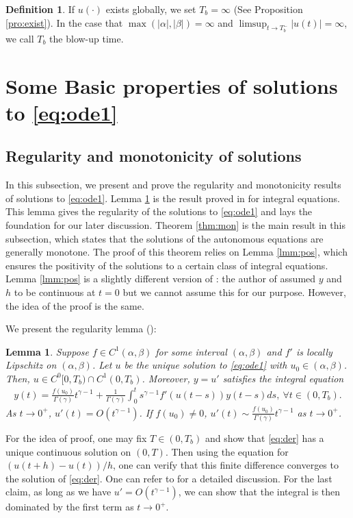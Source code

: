 \documentclass[12pt]{amsart}%
\newtheorem{lmm}[thm]{Lemma}
\theoremstyle{definition}
\newtheorem{definition}[thm]{Definition}
\theoremstyle{remark}
\begin{document}
\begin{definition}
If $u(\cdot)$ exists globally, we set $T_b=\infty$ (See Proposition \ref{pro:exist}). In the case that $\max(|\alpha|, |\beta|)=\infty$ and $\limsup_{t\to T_b^-}|u(t)|=\infty$, we call $T_b$ the blow-up time.
\end{definition}


\section{Some Basic properties of solutions to \eqref{eq:ode1}}\label{sec:basicpro}
\subsection{Regularity and monotonicity of solutions}

In this subsection, we present and prove the regularity and monotonicity results of solutions to \eqref{eq:ode1}. Lemma \ref{lmm:regu} is the result proved in \cite{mf71} for integral equations. This lemma gives the regularity of the solutions to \eqref{eq:ode1} and lays the foundation for our later discussion. Theorem \ref{thm:mon} is the main result in this subsection, which states that the solutions of the autonomous equations are generally monotone. The proof of this theorem relies on Lemma \ref{lmm:pos}, which ensures the positivity of the solutions to a certain class of integral equations. Lemma \ref{lmm:pos} is a slightly different version of \cite[Theorem 1]{weis75}: the author of \cite{weis75} assumed $y$ and $h$ to be continuous at $t=0$ but we cannot assume this for our purpose. However, the idea of the proof is the same.

We present the regularity lemma (\cite[Theorem 1]{mf71}):
\begin{lmm}\label{lmm:regu}
Suppose $f\in C^{1}(\alpha, \beta)$ for some interval $(\alpha, \beta)$ and $f'$ is locally Lipschitz on $(\alpha, \beta)$. Let $u$ be the unique solution to \eqref{eq:ode1} with $u_0\in (\alpha, \beta)$. Then, $u\in C^0[0, T_b)\cap C^{1}(0, T_b)$. Moreover, $y=u'$ satisfies the integral equation
\begin{gather}\label{eq:der}
y(t)=\frac{f(u_0)}{\Gamma(\gamma)}t^{\gamma-1}+\frac{1}{\Gamma(\gamma)}\int_0^t s^{\gamma-1}f'(u(t-s))y(t-s) ds,~\forall t\in (0, T_b).
\end{gather}
  As $t\to 0^+$, $u'(t)=O(t^{\gamma-1})$. If $f(u_0)\neq 0$, $u'(t)\sim \frac{f(u_0)}{\Gamma(\gamma)}t^{\gamma-1}$ as $t\to 0^+$.
\end{lmm}
For the idea of proof, one may fix $T\in (0, T_b)$ and show that \eqref{eq:der} has a unique continuous solution on $(0, T)$. Then using the equation for $(u(t+h)-u(t))/h$, one can verify that this finite difference converges to the solution of \eqref{eq:der}. One can refer to \cite{mf71} for a detailed discussion. For the last claim, as long as we have $u'=O(t^{\gamma-1})$, we can show that the integral is then dominated by the first term as $t\to 0^+$.
\end{document}
